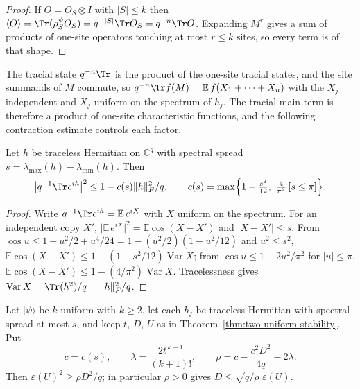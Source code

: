 \begin{proof}
If \(O=O_S\otimes I\) with \(\lvert S\rvert\leq k\) then
\(\langle O\rangle=\Tr(\rho^\psi_SO_S)=q^{-\lvert S\rvert}\Tr O_S
=q^{-n}\Tr O\).  Expanding \(M^r\) gives a sum of products of one-site
operators touching at most \(r\leq k\) sites, so every term is of that
shape.
\end{proof}

The tracial state \(q^{-n}\Tr\) is the product of the one-site tracial
states, and the site summands of \(M\) commute, so
\(q^{-n}\Tr f(M)=\mathbb E\,f(X_1+\cdots+X_n)\) with the \(X_j\)
independent and \(X_j\) uniform on the spectrum of \(h_j\).  The tracial
main term is therefore a product of one-site characteristic functions, and
the following contraction estimate controls each factor.

\begin{lemma}\label{lem:site-contraction}
Let \(h\) be traceless Hermitian on \(\mathbb C^q\) with spectral spread
\(s=\lambda_{\max}(h)-\lambda_{\min}(h)\).  Then
\[
 \bigl\lvert q^{-1}\Tr e^{ih}\bigr\rvert^2
   \leq1-c(s)\lVert h\rVert_F^2/q,
 \qquad
 c(s)=\max\Bigl\{1-\tfrac{s^2}{12},\ \tfrac4{\pi^2}\,[s\leq\pi]\Bigr\}.
\]
\end{lemma}

\begin{proof}
Write \(q^{-1}\Tr e^{ih}=\mathbb E\,e^{iX}\) with \(X\) uniform on the
spectrum.  For an independent copy \(X'\),
\(\lvert\mathbb E\,e^{iX}\rvert^2=\mathbb E\cos(X-X')\) and
\(\lvert X-X'\rvert\leq s\).  From
\(\cos u\leq1-u^2/2+u^4/24=1-(u^2/2)(1-u^2/12)\) and \(u^2\leq s^2\),
\(\mathbb E\cos(X-X')\leq1-(1-s^2/12)\operatorname{Var}X\); from
\(\cos u\leq1-2u^2/\pi^2\) for \(\lvert u\rvert\leq\pi\),
\(\mathbb E\cos(X-X')\leq1-(4/\pi^2)\operatorname{Var}X\).  Tracelessness
gives \(\operatorname{Var}X=\Tr(h^2)/q=\lVert h\rVert_F^2/q\).
\end{proof}

\begin{theorem}
\label{thm:k-uniform-stability}
Let \(\lvert\psi\rangle\) be \(k\)-uniform with \(k\geq2\), let each
\(h_j\) be traceless Hermitian with spectral spread at most \(s\), and keep
\(t\), \(D\), \(U\) as in Theorem~\ref{thm:two-uniform-stability}.  Put
\[
 c=c(s),\qquad
 \lambda=\frac{2t^{\,k-1}}{(k+1)!},\qquad
 \rho=c-\frac{c^2D^2}{4q}-2\lambda .
\]
Then \(\varepsilon(U)^2\geq\rho D^2/q\); in particular \(\rho>0\) gives
\(D\leq\sqrt{q/\rho}\;\varepsilon(U)\).
\end{theorem}

